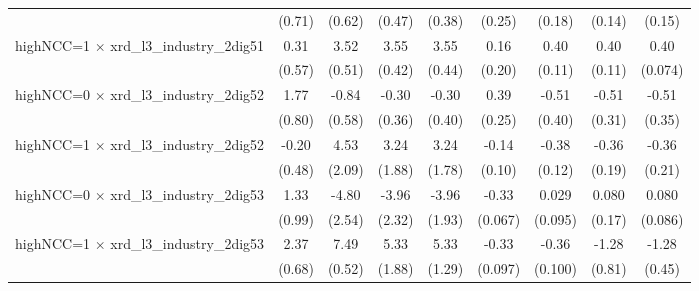 {\begin{tabular}{l*{8}{c}}
                    &      (0.71)         &      (0.62)         &      (0.47)         &      (0.38)         &      (0.25)         &      (0.18)         &      (0.14)         &      (0.15)         \\
\addlinespace
highNCC=1 $\times$ xrd\_l3\_industry\_2dig51&        0.31         &        3.52\sym{***}&        3.55\sym{***}&        3.55\sym{***}&        0.16         &        0.40\sym{***}&        0.40\sym{***}&        0.40\sym{***}\\
                    &      (0.57)         &      (0.51)         &      (0.42)         &      (0.44)         &      (0.20)         &      (0.11)         &      (0.11)         &     (0.074)         \\
\addlinespace
highNCC=0 $\times$ xrd\_l3\_industry\_2dig52&        1.77\sym{**} &       -0.84         &       -0.30         &       -0.30         &        0.39         &       -0.51         &       -0.51         &       -0.51         \\
                    &      (0.80)         &      (0.58)         &      (0.36)         &      (0.40)         &      (0.25)         &      (0.40)         &      (0.31)         &      (0.35)         \\
\addlinespace
highNCC=1 $\times$ xrd\_l3\_industry\_2dig52&       -0.20         &        4.53\sym{**} &        3.24\sym{*}  &        3.24\sym{*}  &       -0.14         &       -0.38\sym{***}&       -0.36\sym{*}  &       -0.36\sym{*}  \\
                    &      (0.48)         &      (2.09)         &      (1.88)         &      (1.78)         &      (0.10)         &      (0.12)         &      (0.19)         &      (0.21)         \\
\addlinespace
highNCC=0 $\times$ xrd\_l3\_industry\_2dig53&        1.33         &       -4.80\sym{*}  &       -3.96\sym{*}  &       -3.96\sym{**} &       -0.33\sym{***}&       0.029         &       0.080         &       0.080         \\
                    &      (0.99)         &      (2.54)         &      (2.32)         &      (1.93)         &     (0.067)         &     (0.095)         &      (0.17)         &     (0.086)         \\
\addlinespace
highNCC=1 $\times$ xrd\_l3\_industry\_2dig53&        2.37\sym{***}&        7.49\sym{***}&        5.33\sym{***}&        5.33\sym{***}&       -0.33\sym{***}&       -0.36\sym{***}&       -1.28         &       -1.28\sym{***}\\
                    &      (0.68)         &      (0.52)         &      (1.88)         &      (1.29)         &     (0.097)         &     (0.100)         &      (0.81)         &      (0.45)         \\

\end{tabular}}
